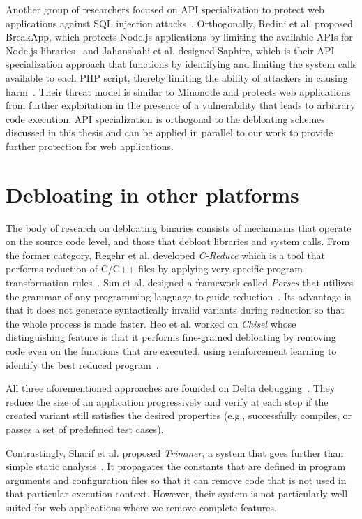 Another group of researchers focused on API specialization to protect web applications against SQL injection attacks~\cite{jahanshahi2020you}.
Orthogonally, Redini et al. proposed BreakApp, which protects Node.js applications by limiting the available APIs for Node.js libraries~\cite{vasilakis2018breakapp} and Jahanshahi et al. designed Saphire, which is their API specialization approach that functions by identifying and limiting the system calls available to each PHP script, thereby limiting the ability of attackers in causing harm~\cite{saphire}. 
Their threat model is similar to Minonode and protects web applications from further exploitation in the presence of a vulnerability that leads to arbitrary code execution. 
API specialization is orthogonal to the debloating schemes discussed in this thesis and can be applied in parallel to our work to provide further protection for web applications. 


\section{Debloating in other platforms}

The body of research on debloating binaries consists of mechanisms that operate on the source code level, and those that debloat libraries and system calls. 
From the former category, Regehr et al. developed \textit{C-Reduce} which is a tool that performs reduction of C/C++ files by applying very specific program transformation rules~\cite{regehr2012CReduce}.
Sun et al. designed a framework called \textit{Perses} that utilizes the grammar of any programming language to guide reduction~\cite{sun2018perses}.
Its advantage is that it does not generate syntactically invalid variants during reduction so that the whole process is made faster.
Heo et al. worked on \textit{Chisel} whose distinguishing feature is that it performs fine-grained debloating by removing code even on the functions that are executed, using reinforcement learning to identify the best reduced program~\cite{heo2018effective}.

All three aforementioned approaches are founded on Delta debugging~\cite{zeller2002Delta}.
They reduce the size of an application progressively and verify at each step if the created variant still satisfies the desired properties (e.g., successfully compiles, or passes a set of predefined test cases).

Contrastingly, Sharif et al. proposed \textit{Trimmer}, a system that goes further than simple static analysis~\cite{sharif2018Trimmer}.
It propagates the constants that are defined in program arguments and configuration files so that it can remove code that is not used in that particular execution context.
However, their system is not particularly well suited for web applications where we remove complete features.

